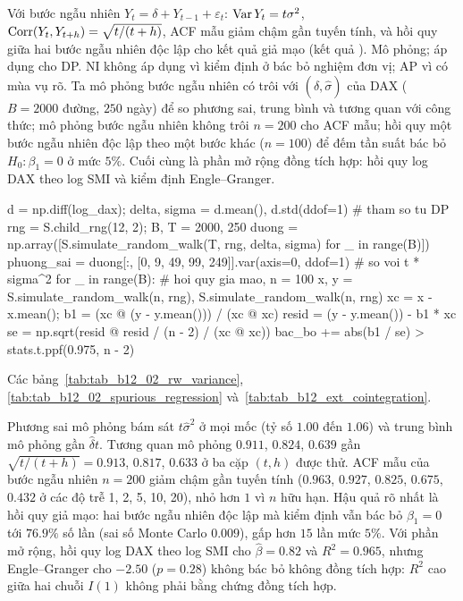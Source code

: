  Với bước ngẫu nhiên $Y_t=\delta+Y_{t-1}+\varepsilon_t$: $\operatorname{Var} Y_t=t\sigma^2$, $\operatorname{Corr}(Y_t,Y_{t+h})=\sqrt{t/(t+h)}$, ACF mẫu giảm chậm gần tuyến tính, và hồi quy giữa hai bước ngẫu nhiên độc lập cho kết quả giả mạo (kết quả ).
 Mô phỏng; áp dụng cho DP. NI không áp dụng vì kiểm định ở  bác bỏ nghiệm đơn vị; AP vì có mùa vụ rõ. Ta mô phỏng bước ngẫu nhiên có trôi với $(\hat\delta,\hat\sigma)$ của DAX ($B=2000$ đường, $250$ ngày) để so phương sai, trung bình và tương quan với công thức; mô phỏng bước ngẫu nhiên không trôi $n=200$ cho ACF mẫu; hồi quy một bước ngẫu nhiên độc lập theo một bước khác ($n=100$) để đếm tần suất bác bỏ $H_0:\beta_1=0$ ở mức $5\%$. Cuối cùng là phần mở rộng đồng tích hợp: hồi quy log DAX theo log SMI và kiểm định Engle--Granger.
\begin{codeblock}
d = np.diff(log_dax); delta, sigma = d.mean(), d.std(ddof=1)      # tham so tu DP
rng = S.child_rng(12, 2); B, T = 2000, 250
duong = np.array([S.simulate_random_walk(T, rng, delta, sigma) for _ in range(B)])
phuong_sai = duong[:, [0, 9, 49, 99, 249]].var(axis=0, ddof=1)    # so voi t * sigma^2
for _ in range(B):                                    # hoi quy gia mao, n = 100
    x, y = S.simulate_random_walk(n, rng), S.simulate_random_walk(n, rng)
    xc = x - x.mean(); b1 = (xc @ (y - y.mean())) / (xc @ xc)
    resid = (y - y.mean()) - b1 * xc
    se = np.sqrt(resid @ resid / (n - 2) / (xc @ xc))
    bac_bo += abs(b1 / se) > stats.t.ppf(0.975, n - 2)
\end{codeblock}
 Các bảng~\ref{tab:tab_b12_02_rw_variance}, \ref{tab:tab_b12_02_spurious_regression} và~\ref{tab:tab_b12_ext_cointegration}.



 Phương sai mô phỏng bám sát $t\hat\sigma^2$ ở mọi mốc (tỷ số $1.00$ đến $1.06$) và trung bình mô phỏng gần $\hat\delta t$. Tương quan mô phỏng $0.911$, $0.824$, $0.639$ gần $\sqrt{t/(t+h)}=0.913$, $0.817$, $0.633$ ở ba cặp $(t,h)$ được thử. ACF mẫu của bước ngẫu nhiên $n=200$ giảm chậm gần tuyến tính ($0.963$, $0.927$, $0.825$, $0.675$, $0.432$ ở các độ trễ 1, 2, 5, 10, 20), nhỏ hơn $1$ vì $n$ hữu hạn. Hậu quả rõ nhất là hồi quy giả mạo: hai bước ngẫu nhiên độc lập mà kiểm định vẫn bác bỏ $\beta_1=0$ tới $76.9\%$ số lần (sai số Monte Carlo $0.009$), gấp hơn $15$ lần mức $5\%$. Với phần mở rộng, hồi quy log DAX theo log SMI cho $\hat\beta=0.82$ và $R^2=0.965$, nhưng Engle--Granger cho $-2.50$ ($p=0.28$) không bác bỏ không đồng tích hợp: $R^2$ cao giữa hai chuỗi $I(1)$ không phải bằng chứng đồng tích hợp.

